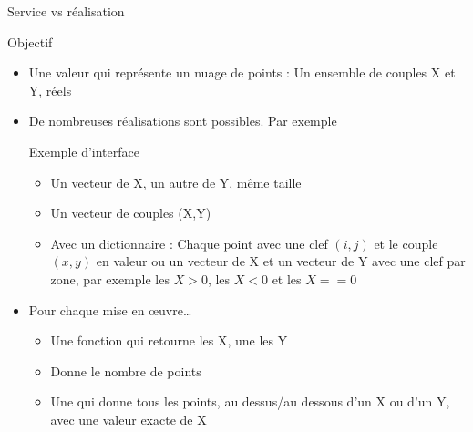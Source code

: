 \documentclass[handout,10pt]{beamer}
\begin{document}
\begin{frame}[fragile]{Service vs réalisation}
\tiny
\begin{block}{Objectif}
\begin{itemize}
\item Une valeur qui représente un nuage de points : Un ensemble de couples X et Y, réels
\item De nombreuses réalisations sont possibles. Par exemple
\begin{exampleblock}{Exemple d'interface}
\begin{itemize}
\item Un vecteur de X, un autre de Y, même taille
\item Un vecteur de couples (X,Y)
\item Avec un dictionnaire : Chaque point avec une clef $(i,j)$ et le couple $(x,y)$ en valeur ou un vecteur de X et un vecteur de Y avec une clef par zone, par exemple les $X>0$, les $X<0$ et les $X==0$
\end{itemize}
\end{exampleblock}
\item Pour chaque mise en œuvre\ldots
\begin{itemize}
\item Une fonction qui retourne les X, une les Y
\item Donne le nombre de points
\item Une qui donne tous les points, au dessus/au dessous d'un X ou d'un Y, avec une valeur exacte de X
\end{itemize}
\end{itemize}
\end{block}
\end{frame}
\end{document}
